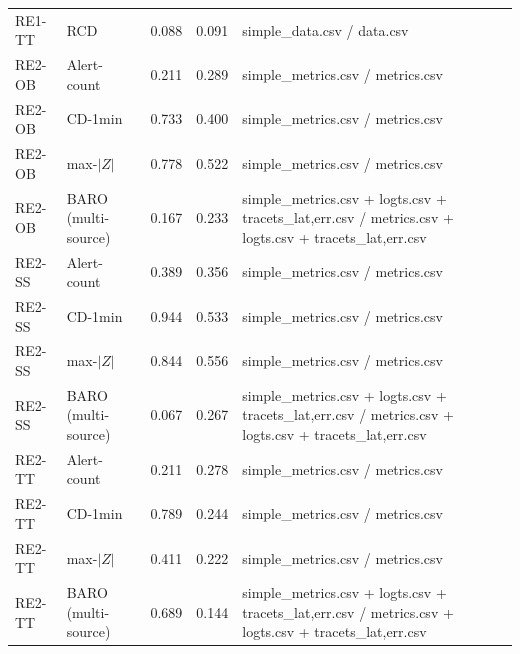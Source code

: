 {\begin{longtable}{llrrl}
RE1-TT & RCD & 0.088 & 0.091 & simple\_data.csv / data.csv \\
RE2-OB & Alert-count & 0.211 & 0.289 & simple\_metrics.csv / metrics.csv \\
RE2-OB & CD-1min & 0.733 & 0.400 & simple\_metrics.csv / metrics.csv \\
RE2-OB & max-$|Z|$ & 0.778 & 0.522 & simple\_metrics.csv / metrics.csv \\
RE2-OB & BARO (multi-source) & 0.167 & 0.233 & simple\_metrics.csv + logts.csv + tracets\_{lat,err}.csv / metrics.csv + logts.csv + tracets\_{lat,err}.csv \\
RE2-SS & Alert-count & 0.389 & 0.356 & simple\_metrics.csv / metrics.csv \\
RE2-SS & CD-1min & 0.944 & 0.533 & simple\_metrics.csv / metrics.csv \\
RE2-SS & max-$|Z|$ & 0.844 & 0.556 & simple\_metrics.csv / metrics.csv \\
RE2-SS & BARO (multi-source) & 0.067 & 0.267 & simple\_metrics.csv + logts.csv + tracets\_{lat,err}.csv / metrics.csv + logts.csv + tracets\_{lat,err}.csv \\
RE2-TT & Alert-count & 0.211 & 0.278 & simple\_metrics.csv / metrics.csv \\
RE2-TT & CD-1min & 0.789 & 0.244 & simple\_metrics.csv / metrics.csv \\
RE2-TT & max-$|Z|$ & 0.411 & 0.222 & simple\_metrics.csv / metrics.csv \\
RE2-TT & BARO (multi-source) & 0.689 & 0.144 & simple\_metrics.csv + logts.csv + tracets\_{lat,err}.csv / metrics.csv + logts.csv + tracets\_{lat,err}.csv \\
\end{longtable}
}
